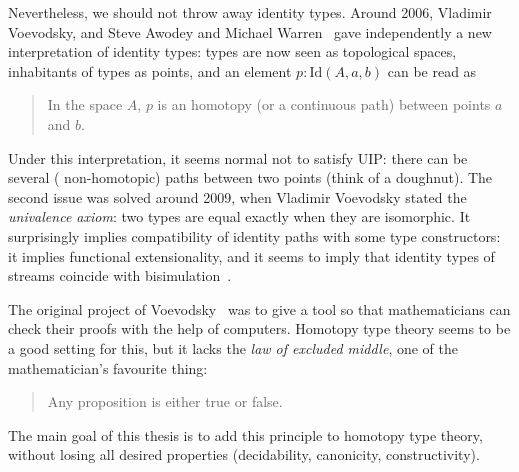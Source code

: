 Nevertheless, we should not throw away identity types. Around 2006,
Vladimir Voevodsky, and Steve Awodey and Michael
Warren~\cite{awodey-warren} gave independently a new interpretation of
identity types: types are now seen as topological spaces, inhabitants
of types as points, and an element $p:\mathrm{Id}(A,a,b)$ can be read as
\begin{quotation} In the space $A$, $p$ is an homotopy (or a
continuous path) between points $a$ and $b$.
\end{quotation} Under this interpretation, it seems normal not to
satisfy UIP: there can be several (\ie{} non-homotopic) paths between
two points (think of a doughnut). The second issue was solved around
2009, when Vladimir Voevodsky stated the {\em univalence axiom}: two
types are equal exactly when they are isomorphic. It surprisingly
implies compatibility of identity paths with some type constructors:
it implies functional extensionality,
and it seems to imply that identity types of streams coincide with bisimulation~\cite{licata14uafs}.

The original project of Voevodsky~\cite{vv-nsf} was to give a tool so
that mathematicians can check their proofs with the help of
computers. Homotopy type theory seems to be a good setting for this,
but it lacks the {\em law of excluded middle}, one of the
mathematician's favourite thing:
\begin{quotation}
  Any proposition is either true or false.
\end{quotation}
The main goal of this thesis is to add this principle to homotopy type
theory, without losing all desired properties (decidability,
canonicity, constructivity).


